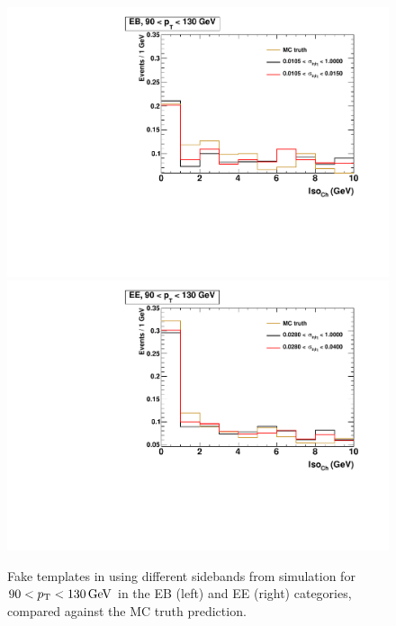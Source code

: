 \begin{figure}[!htbp]
  \centering
  \includegraphics[scale=0.40]{figures/closure_test_fake_template_chIso_EB_pt90To130_sample_all.pdf}
  \includegraphics[scale=0.40]{figures/closure_test_fake_template_chIso_EE_pt90To130_sample_all.pdf}
  \caption{Fake templates in \chiso using different \sieie sidebands from simulation for $90 < p_{\mathrm{T}} < 130\,\text{Ge\hspace{-.08em}V}$ in the EB (left) and EE (right) categories, compared against the MC truth prediction.}
  \label{fig:mc_fake_templates_fixed_pt_chiso}
\end{figure}


